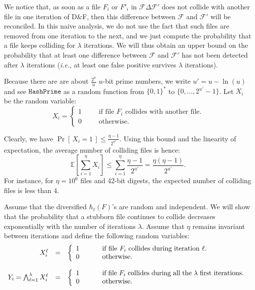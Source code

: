 \documentclass[twoside,envcountsame,runningheads]{llncs}
\newcommand{\Prob}[1]{{\Pr\left[\,{#1}\,\right]}}
\newcommand{\EE}[1]{{\mathbb{E}\left[{#1}\right]}}
\newcommand{\Files}{\mathcal{F}}
\newcommand{\df}{D\&F\xspace}
\newcommand{\ie}{\textit{i.e.}\xspace}
\newcommand{\HashPrime}{\ensuremath{\mathtt{HashPrime}}}
\begin{document}
We notice that, as soon as a file $F_i$ or $F'_i$ in $\Files \Delta \Files'$ does not collide with another file in one iteration of \df, then this difference between $\Files$ and $\Files'$ will be reconciled.
In this naive analysis, we do not use the fact that such files are removed from one iteration to the next, and we just compute the probability that a file keeps colliding for $\lambda$ iterations. We will thus obtain an upper bound on the probability that at least one difference between $\Files$ and $\Files'$ has not been detected after $\lambda$ iterations (\ie, at least one false positive survives $\lambda$ iterations).

Because there are are about $\frac{2^u}{u}$ $u$-bit prime numbers, we write $u' = u - \ln(u)$ and see $\HashPrime$ as a random function from $\{0,1\}^*$ to $\{0,\dots,2^{u'}-1\}$. Let $X_i$ be the random variable:
\[
X_i =
\left\{
\begin{array}{lcl}
1 & ~~~~&  \mbox{if file $F_i$ collides with another file.}\\
0 & ~~~~&  \mbox{otherwise.}
\end{array}
\right.
\]

Clearly, we have $\Prob{X_i = 1} \le \frac{\eta -1}{2^{u'}}$.
Using this bound and the linearity of expectation, the average number of colliding files is hence:
\[ \EE{\sum_{i=1}^{\eta} X_i} \le \sum_{i=1}^{\eta} \frac{\eta -1}{2^{u'}} = \frac{\eta (\eta - 1)}{2^{u'}}. \]
For instance, for $\eta=10^6$ files and 42-bit digests, the expected number of colliding files is less than $4$.

Assume that the diversified $\hbar_\ell(F)$'s are random and independent. 
We will show that the probability that a stubborn file continues to collide decreases exponentially with the number of iterations $\lambda$. Assume that $\eta$ remains invariant between iterations and define the following random variables:
\[
\begin{array}{rcl}
X^{\ell}_i & = &
\left\{
\begin{array}{lcl}
1 & ~~~~&  \parbox[t]{.6\textwidth}{if file $F_i$ collides during iteration $\ell$.}\\
0 & ~~~~&  \mbox{otherwise.}
\end{array}
\right.\\
\\
Y_i = \bigwedge_{\ell=1}^\lambda X^{\ell}_i & = &
\left\{
\begin{array}{lcl}
1 & ~~~~&  \parbox[t]{.6\textwidth}{if file $F_i$ collides during all the $\lambda$ first iterations.}\\
0 & ~~~~&  \mbox{otherwise.}
\end{array}
\right.
\end{array}\]
\end{document}
